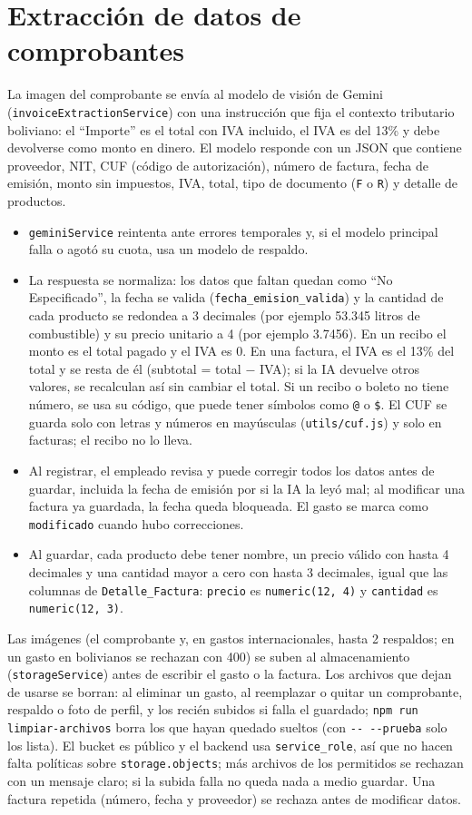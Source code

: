 \documentclass[11pt,letterpaper]{article}
\newcommand{\code}[1]{\nolinkurl{#1}}
\begin{document}
\section{Extracción de datos de comprobantes}
La imagen del comprobante se envía al modelo de visión de Gemini (\code{invoiceExtractionService}) con una instrucción que fija el contexto tributario boliviano: el ``Importe'' es el total con IVA incluido, el IVA es del 13\% y debe devolverse como monto en dinero. El modelo responde con un JSON que contiene proveedor, NIT, CUF (código de autorización), número de factura, fecha de emisión, monto sin impuestos, IVA, total, tipo de documento (\code{F} o \code{R}) y detalle de productos.

\begin{itemize}
  \item \code{geminiService} reintenta ante errores temporales y, si el modelo principal falla o agotó su cuota, usa un modelo de respaldo.
  \item La respuesta se normaliza: los datos que faltan quedan como ``No Especificado'', la fecha se valida (\code{fecha_emision_valida}) y la cantidad de cada producto se redondea a 3 decimales (por ejemplo 53.345 litros de combustible) y su precio unitario a 4 (por ejemplo 3.7456). En un recibo el monto es el total pagado y el IVA es 0. En una factura, el IVA es el 13\% del total y se resta de él (subtotal = total $-$ IVA); si la IA devuelve otros valores, se recalculan así sin cambiar el total. Si un recibo o boleto no tiene número, se usa su código, que puede tener símbolos como \code{@} o \code{\$}. El CUF se guarda solo con letras y números en mayúsculas (\code{utils/cuf.js}) y solo en facturas; el recibo no lo lleva.
  \item Al registrar, el empleado revisa y puede corregir todos los datos antes de guardar, incluida la fecha de emisión por si la IA la leyó mal; al modificar una factura ya guardada, la fecha queda bloqueada. El gasto se marca como \code{modificado} cuando hubo correcciones.
  \item Al guardar, cada producto debe tener nombre, un precio válido con hasta 4 decimales y una cantidad mayor a cero con hasta 3 decimales, igual que las columnas de \code{Detalle_Factura}: \code{precio} es \code{numeric(12, 4)} y \code{cantidad} es \code{numeric(12, 3)}.
\end{itemize}

Las imágenes (el comprobante y, en gastos internacionales, hasta 2 respaldos; en un gasto en bolivianos se rechazan con 400) se suben al almacenamiento (\code{storageService}) antes de escribir el gasto o la factura. Los archivos que dejan de usarse se borran: al eliminar un gasto, al reemplazar o quitar un comprobante, respaldo o foto de perfil, y los recién subidos si falla el guardado; \code{npm run limpiar-archivos} borra los que hayan quedado sueltos (con \code{-- --prueba} solo los lista). El bucket es público y el backend usa \code{service_role}, así que no hacen falta políticas sobre \code{storage.objects}; más archivos de los permitidos se rechazan con un mensaje claro; si la subida falla no queda nada a medio guardar. Una factura repetida (número, fecha y proveedor) se rechaza antes de modificar datos.
\end{document}

